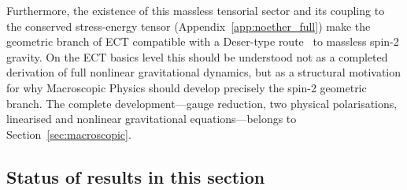 \documentclass[11pt,a4paper]{article}
\numberwithin{equation}{section}
\begin{document}
Furthermore, the existence of this massless tensorial sector and
its coupling to the conserved stress-energy tensor
(Appendix~\ref{app:noether_full}) make the geometric branch of ECT
compatible with a Deser-type route~\cite{Deser1970} to massless spin-2
gravity. On the ECT basics level this should be understood not as
a completed derivation of full nonlinear gravitational dynamics,
but as a structural motivation for why Macroscopic Physics should
develop precisely the spin-2 geometric branch.
The complete development---gauge reduction, two physical polarisations,
linearised and nonlinear gravitational equations---belongs to
Section~\ref{sec:macroscopic}.

\subsection{Status of results in this section}
\label{sec:spectrum_status}
\end{document}
